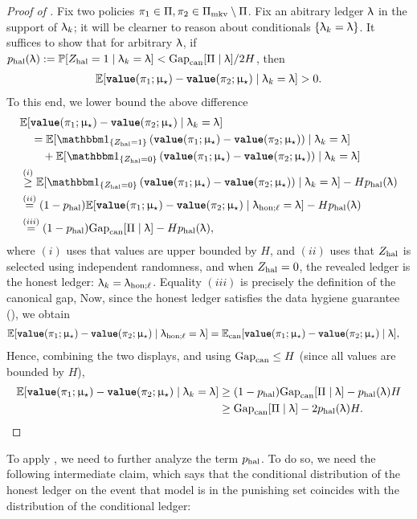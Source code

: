 \begin{proof}[Proof of ] Fix two policies $\pi_1 \in \Pi,\pi_2 \in \Pi_{\mathrm{mkv}} \setminus \Pi$. Fix an abitrary ledger $\uplambda$ in the support of $\uplambda_k$; it will be clearner to reason about conditionals $\{\uplambda_k = \uplambda\}$. It suffices to show that for arbitrary $\uplambda$, if $p_{\mathrm{hal}}(\uplambda) := \operatorname{\mathbb{P}}[Z_{\mathrm{hal}} = 1\mid \uplambda_k = \uplambda] <  \mathrm{Gap}_{\mathrm{can}}[\Pi \mid \uplambda]/2H$, then
\begin{align*}
\mathbb{E}[{\normalfont \texttt{\textbf{value}}}(\pi_1;\upmu_{\star}) - {\normalfont \texttt{\textbf{value}}}(\pi_2;\upmu_{\star}) \mid \uplambda_k = \uplambda] > 0.
\end{align*}
To this end, we lower bound the above difference
\begin{align*}
&\Exp[\valuef{\pi_1}{\modst} - \valuef{\pi_2}{\modst} \mid \ledger_k = \ledger]\\
&\quad= \Exp[\ind_{\{\Zhal = 1\}} \left(\valuef{\pi_1}{\modst} - \valuef{\pi_2}{\modst}\right) \mid \ledger_k = \ledger]\\
&\qquad+ \Exp[\ind_{\{\Zhal = 0\}} \left(\valuef{\pi_1}{\modst} - \valuef{\pi_2}{\modst}\right) \mid \ledger_k = \ledger]\\
&\overset{(i)}{\ge}  \Exp[\ind_{\{\Zhal = 0\}} \left(\valuef{\pi_1}{\modst} - \valuef{\pi_2}{\modst}\right) \mid  \ledger_k = \ledger] - H\phal(\ledger)\\
&\overset{(ii)}{=}   (1-\phal)\Exp[ \valuef{\pi_1}{\modst} - \valuef{\pi_2}{\modst} \mid \ledhonl = \ledger] - H\phal(\ledger)\\
&\overset{(iii)}{=}   (1-\phal)\gapcan[ \Pi \mid \ledger] - H\phal(\ledger),
\end{align*}
where $(i)$ uses that values are upper bounded by $H$, and $(ii)$ uses that $Z_{\mathrm{hal}}$ is selected using independent randomness, and when $Z_{\mathrm{hal}} = 0$, the revealed ledger is the honest ledger: $\uplambda_k= \uplambda_{\mathrm{hon};\ell}$. Equality $(iii)$ is precisely the definition of the canonical gap, 
Now, since the honest ledger satisfies the data hygiene guarantee (), we obtain
\begin{align*}
\mathbb{E}[{\normalfont \texttt{\textbf{value}}}(\pi_1;\upmu_{\star}) - {\normalfont \texttt{\textbf{value}}}(\pi_2;\upmu_{\star})\mid \uplambda_{\mathrm{hon};\ell} = \uplambda] &= \mathbb{E}_{\mathrm{can}}[{\normalfont \texttt{\textbf{value}}}(\pi_1;\upmu_{\star}) - {\normalfont \texttt{\textbf{value}}}(\pi_2;\upmu_{\star}) \mid \uplambda],
\end{align*}
 Hence, combining the two displays, and using $\mathrm{Gap}_{\mathrm{can}} \le H$ (since all values are bounded by $H$),
\begin{align*}
\mathbb{E}[{\normalfont \texttt{\textbf{value}}}(\pi_1;\upmu_{\star}) - {\normalfont \texttt{\textbf{value}}}(\pi_2;\upmu_{\star}) \mid  \uplambda_k = \uplambda] &\ge (1 - p_{\mathrm{hal}})\mathrm{Gap}_{\mathrm{can}}[ \Pi \mid \uplambda] - p_{\mathrm{hal}}(\uplambda) H \\
&\ge \mathrm{Gap}_{\mathrm{can}}[ \Pi \mid \uplambda] - 2p_{\mathrm{hal}}(\uplambda) H. \qquad\qedhere
\end{align*}
\end{proof}
To apply , we need to further analyze the term $p_{\mathrm{hal}}$. To do so, we need the following intermediate claim, which says that the conditional distribution of the honest ledger on the event that model is in the punishing set coincides with the distribution of the conditional ledger:
\newcommand{\ledcs}{\ledger_{\mathrm{cens}}}



